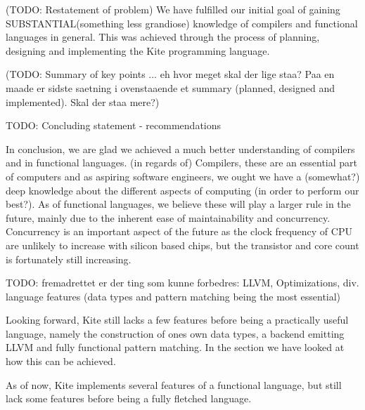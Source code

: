
(TODO: Restatement of problem)
We have fulfilled our initial goal of gaining SUBSTANTIAL(something less grandiose) knowledge of compilers and functional languages in general. This was achieved through the process of planning, designing and implementing the Kite programming language.


(TODO: Summary of key points
... eh hvor meget skal der lige staa? Paa en maade er sidste saetning i ovenstaaende et summary (planned, designed and implemented). Skal der staa mere?)


TODO: Concluding statement - recommendations

In conclusion, we are glad we achieved a much better understanding of compilers and in functional languages. (in regards of) Compilers, these are an essential part of computers and as aspiring software engineers, we ought we have a (somewhat?) deep knowledge about the different aspects of computing (in order to perform our best?). As of functional languages, we believe these will play a larger rule in the future, mainly due to the inherent ease of maintainability and concurrency. Concurrency is an important aspect of the future as the clock frequency of CPU are unlikely to increase with silicon based chips, but the transistor and core count is fortunately still increasing.


TODO: fremadrettet er der ting som kunne forbedres: LLVM, Optimizations, div. language features (data types and pattern matching being the most essential)

Looking forward, Kite still lacks a few features before being a practically useful language, namely the construction of ones own data types, a backend emitting LLVM and fully functional pattern matching. In the section  we have looked at how this can be achieved.

As of now, Kite implements several features of a functional language, but still lack some features before being a fully fletched language.
